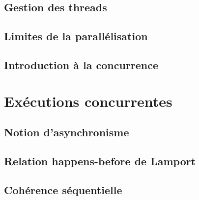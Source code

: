\documentclass[9pt, handout]{beamer}
\begin{document}
\subsection{Gestion des threads}








 
\subsection{Limites de la parallélisation}




 
\subsection{Introduction à la concurrence}





 
\section{Exécutions concurrentes}
 
\subsection{Notion d'asynchronisme}


 
\subsection{Relation happens-before de Lamport}



 
\subsection{Cohérence séquentielle}


 
\end{document}
